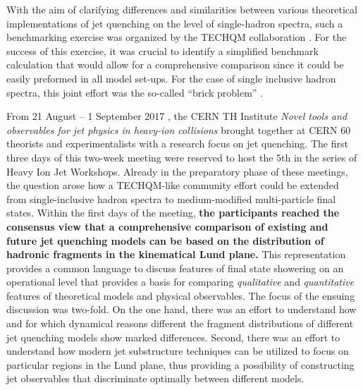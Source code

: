 With the aim of clarifying differences and similarities between various theoretical implementations of jet quenching on the level of single-hadron spectra, such a benchmarking exercise was organized by the TECHQM collaboration \cite{TECHQM}. For the success of this exercise, it was crucial to identify a simplified 
benchmark calculation that would allow for a comprehensive comparison since it could be easily preformed in all model set-ups. For the case of single inclusive
hadron spectra, this joint effort was the so-called ``brick problem'' \cite{Armesto:2011ht,Burke:2013yra}.

From 21 August -- 1 September 2017 \cite{THinst}, the CERN TH Institute  {\sl Novel tools and observables for jet physics in heavy-ion collisions} brought 
together at CERN 60 theorists and experimentalists with a research focus on jet quenching. The first three days of this two-week meeting were reserved 
to host the 5th in the series of Heavy Ion Jet Workshops.
Already in the preparatory phase of these meetings, the question arose how a TECHQM-like community 
effort could be extended from single-inclusive hadron spectra to medium-modified multi-particle final states. Within the first days of the meeting, {\bf the 
participants reached the consensus view that a comprehensive comparison of existing and future jet quenching models can be based on the
distribution of hadronic fragments in the kinematical Lund plane.} 
This representation provides a common language to discuss features of final state showering on an operational level that provides a basis for comparing {\sl qualitative} and {\sl quantitative} features of theoretical models and physical observables.
The focus of the ensuing discussion was two-fold. On the one hand, there was an effort to understand
how and for which dynamical reasons different the fragment distributions of different jet quenching models show marked differences. Second, there was an
effort to understand how modern jet substructure techniques can be utilized to focus on particular regions in the Lund plane, thus providing a possibility of
constructing jet observables that discriminate optimally between different models. 

